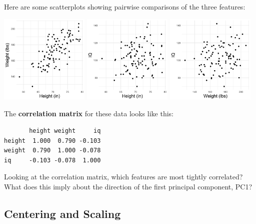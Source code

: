 \noindent Here are some scatterplots showing pairwise comparisons of the three features:

\begin{center}
\includegraphics[width=0.32\textwidth]{img/l04-example-1.png}
\includegraphics[width=0.32\textwidth]{img/l04-example-2.png}
\includegraphics[width=0.32\textwidth]{img/l04-example-3.png}
\end{center}

\noindent The \textbf{correlation matrix} for these data looks like this:

\begin{verbatim}
       height weight     iq
height  1.000  0.790 -0.103
weight  0.790  1.000 -0.078
iq     -0.103 -0.078  1.000
\end{verbatim}

\vspace{2mm}

\begin{question}{}
Looking at the correlation matrix, which features are most tightly correlated? What does this imply about the direction of the first principal component, PC1? 
\end{question}

\subsection{Centering and Scaling}

